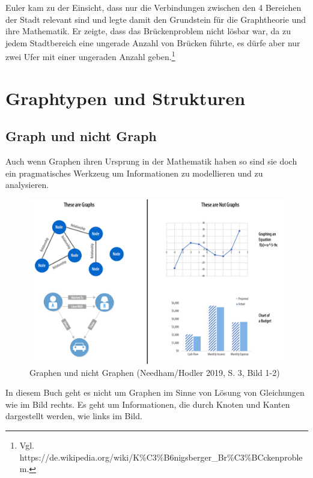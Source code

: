 \documentclass[ngerman,]{scrreprt}
\begin{document}
Euler kam zu der Einsicht, dass nur die Verbindungen zwischen den 4 Bereichen der Stadt relevant sind und legte damit den Grundstein für die Graphtheorie und ihre Mathematik. Er zeigte, dass das Brückenproblem nicht lösbar war, da zu jedem Stadtbereich eine ungerade Anzahl von Brücken führte, es dürfe aber nur zwei Ufer mit einer ungeraden Anzahl geben.\footnote{Vgl. https://de.wikipedia.org/wiki/K\%C3\%B6nigsberger\_Br\%C3\%BCckenproblem.}

\hypertarget{graphtypen-und-strukturen}{%
\section{Graphtypen und Strukturen}\label{graphtypen-und-strukturen}}

\hypertarget{graph-und-nicht-graph}{%
\subsection{Graph und nicht Graph}\label{graph-und-nicht-graph}}

Auch wenn Graphen ihren Ursprung in der Mathematik haben so sind sie doch ein pragmatisches Werkzeug um Informationen zu modellieren und zu analysieren.

\begin{figure}
\centering
\includegraphics{Bilder/Graph-Algorithms/02-1-2-GraphsNotGraphs.png}
\caption{Graphen und nicht Graphen (Needham/Hodler 2019, S. 3, Bild 1-2)}
\end{figure}

In diesem Buch geht es nicht um Graphen im Sinne von Lösung von Gleichungen wie im Bild rechts. Es geht um Informationen, die durch Knoten und Kanten dargestellt werden, wie links im Bild.
\end{document}
